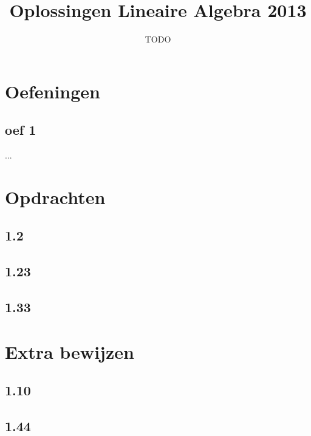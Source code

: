 \documentclass[10pt,a4paper]{article}
\title{Oplossingen Lineaire Algebra 2013}
\author{TODO}
\begin{document}
\maketitle
\pagebreak
\tableofcontents
\pagebreak


\section{Oefeningen}
\subsection{oef 1}
...

\section{Opdrachten}
\subsection{1.2}

\subsection{1.23}

\subsection{1.33}

\section{Extra bewijzen}

\subsection{1.10}

\subsection{1.44}
\end{document}
